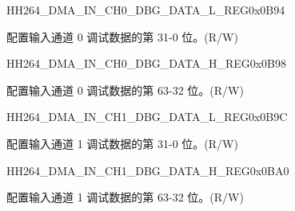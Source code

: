     
    \begin{register}{H}{H264\_DMA\_IN\_CH0\_DBG\_DATA\_L\_REG}{0x0B94}\label{regdesc:H264DMAINCH0DBGDATALREG}
    \regnewline%
    \begin{regdesc}\begin{reglist}
    \label{fielddesc:H264INCH0DBGDATAL}\item [H264\_IN\_CH0\_DBG\_DATA\_L] 配置输入通道 0 调试数据的第 31-0 位。(R/W)
    \end{reglist}\end{regdesc}
    \end{register}
    
    
    \begin{register}{H}{H264\_DMA\_IN\_CH0\_DBG\_DATA\_H\_REG}{0x0B98}\label{regdesc:H264DMAINCH0DBGDATAHREG}
    \regnewline%
    \begin{regdesc}\begin{reglist}
    \label{fielddesc:H264INCH0DBGDATAH}\item [H264\_IN\_CH0\_DBG\_DATA\_H] 配置输入通道 0 调试数据的第 63-32 位。(R/W)
    \end{reglist}\end{regdesc}
    \end{register}
    
    
    \begin{register}{H}{H264\_DMA\_IN\_CH1\_DBG\_DATA\_L\_REG}{0x0B9C}\label{regdesc:H264DMAINCH1DBGDATALREG}
    \regnewline%
    \begin{regdesc}\begin{reglist}
    \label{fielddesc:H264INCH1DBGDATAL}\item [H264\_IN\_CH1\_DBG\_DATA\_L] 配置输入通道 1 调试数据的第 31-0 位。(R/W)
    \end{reglist}\end{regdesc}
    \end{register}
    
    
    \begin{register}{H}{H264\_DMA\_IN\_CH1\_DBG\_DATA\_H\_REG}{0x0BA0}\label{regdesc:H264DMAINCH1DBGDATAHREG}
    \regnewline%
    \begin{regdesc}\begin{reglist}
    \label{fielddesc:H264INCH1DBGDATAH}\item [H264\_IN\_CH1\_DBG\_DATA\_H] 配置输入通道 1 调试数据的第 63-32 位。(R/W)
    \end{reglist}\end{regdesc}
    \end{register}
    
